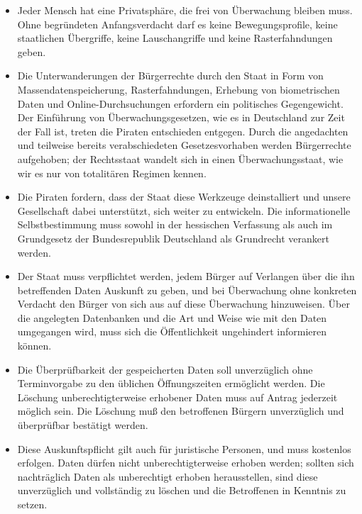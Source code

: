\documentclass[10pt,a4paper,twocolumn,twoside,titlepage]{article}
\begin{document}
{}
\begin{itemize}


\item Jeder Mensch hat eine Privatsphäre, die frei von Überwachung bleiben muss. Ohne begründeten Anfangsverdacht darf es keine Bewegungsprofile, keine staatlichen Übergriffe, keine Lauschangriffe und keine Rasterfahndungen geben.

\item Die Unterwanderungen der Bürgerrechte durch den Staat in Form von Massendatenspeicherung, Rasterfahndungen, Erhebung von biometrischen Daten und Online-Durchsuchungen erfordern ein politisches Gegengewicht. Der Einführung von Überwachungsgesetzen, wie es in Deutschland zur Zeit der Fall ist, treten die Piraten entschieden entgegen. Durch die angedachten und teilweise bereits verabschiedeten Gesetzesvorhaben werden Bürgerrechte aufgehoben; der Rechtsstaat wandelt sich in einen Überwachungsstaat, wie wir es nur von totalitären Regimen kennen.

\item Die Piraten fordern, dass der Staat diese Werkzeuge deinstalliert und unsere Gesellschaft dabei unterstützt, sich weiter zu entwickeln. Die informationelle Selbstbestimmung muss sowohl in der hessischen Verfassung als auch im Grundgesetz der Bundesrepublik Deutschland als Grundrecht verankert werden.

\item Der Staat muss verpflichtet werden, jedem Bürger auf Verlangen über die ihn betreffenden Daten Auskunft zu geben, und bei Überwachung ohne konkreten Verdacht den Bürger von sich aus auf diese Überwachung hinzuweisen. Über die angelegten Datenbanken und die Art und Weise wie mit den Daten umgegangen wird, muss sich die Öffentlichkeit ungehindert informieren können.

\item Die Überprüfbarkeit der gespeicherten Daten soll unverzüglich ohne Terminvorgabe zu den üblichen Öffnungszeiten ermöglicht werden. Die Löschung unberechtigterweise erhobener Daten muss auf Antrag jederzeit möglich sein. Die Löschung muß den betroffenen Bürgern unverzüglich und überprüfbar bestätigt werden.

\item Diese Auskunftspflicht gilt auch für juristische Personen, und muss kostenlos erfolgen.
Daten dürfen nicht unberechtigterweise erhoben werden; sollten sich nachträglich Daten als unberechtigt erhoben herausstellen, sind diese unverzüglich und vollständig zu löschen und die Betroffenen in Kenntnis zu setzen.
\end{itemize}
\end{document}
